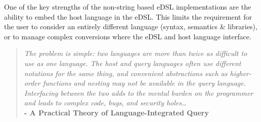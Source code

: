 \noindent
One of the key strengths of the non-string based eDSL implementations are the ability to embed the host language in the eDSL.
This limits the requirement for the user to consider an entirely different language (syntax, semantics \& libraries), or to
manage complex conversions where the eDSL and host language interface.
\begin{quote}
    \textit{The problem is simple: two languages are more than twice as difficult to use as one language.
        The host and query languages often use different notations for the same thing, and convenient
        abstractions such as higher-order functions and nesting may not be available in the query language.
        Interfacing between the two adds to the mental burden on the programmer and leads to complex code,
        bugs, and security holes\dots}
    \\ \textbf{- A Practical Theory of Language-Integrated Query}\cite{PracticalTheoryLINQPaper}
\end{quote}


